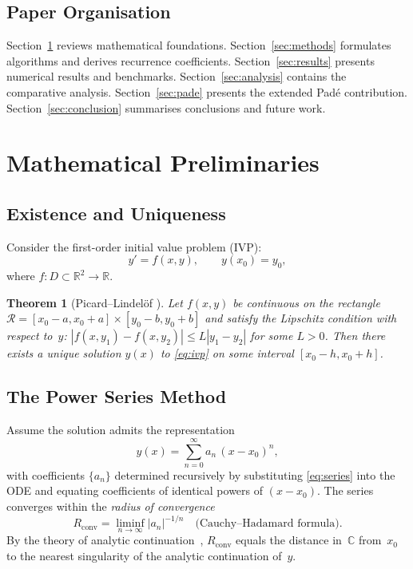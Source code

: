 \documentclass[12pt,a4paper]{article}
\newtheorem{theorem}{Theorem}[section]
\theoremstyle{definition}
\theoremstyle{remark}
\newcommand{\R}{\mathbb{R}}
\newcommand{\C}{\mathbb{C}}
\newcommand{\Rconv}{R_{\mathrm{conv}}}
\newcommand{\abs}[1]{\left\lvert #1 \right\rvert}
\begin{document}
\subsection{Paper Organisation}

Section~\ref{sec:prelim} reviews mathematical foundations.
Section~\ref{sec:methods} formulates algorithms and derives
recurrence coefficients.
Section~\ref{sec:results} presents numerical results and benchmarks.
Section~\ref{sec:analysis} contains the comparative analysis.
Section~\ref{sec:pade} presents the extended Padé contribution.
Section~\ref{sec:conclusion} summarises conclusions and future work.

\section{Mathematical Preliminaries}
\label{sec:prelim}

\subsection{Existence and Uniqueness}

Consider the first-order initial value problem (IVP):
\begin{equation}
  y' = f(x, y), \qquad y(x_0) = y_0,
  \label{eq:ivp}
\end{equation}
where $f: D \subset \R^2 \to \R$.

\begin{theorem}[Picard--Lindelöf {\cite{picard1890,lindelof1894}}]
  \label{thm:pl}
  Let $f(x,y)$ be continuous on the rectangle
  $\mathcal{R} = [x_0{-}a, x_0{+}a] \times [y_0{-}b, y_0{+}b]$
  and satisfy the Lipschitz condition with respect to~$y$:
  $\abs{f(x,y_1) - f(x,y_2)} \leq L\abs{y_1 - y_2}$ for some
  $L > 0$.  Then there exists a unique solution $y(x)$ to
  \eqref{eq:ivp} on some interval $[x_0{-}h, x_0{+}h]$.
\end{theorem}

\subsection{The Power Series Method}

Assume the solution admits the representation
\begin{equation}
  y(x) = \sum_{n=0}^{\infty} a_n\,(x - x_0)^n,
  \label{eq:series}
\end{equation}
with coefficients $\{a_n\}$ determined recursively by substituting
\eqref{eq:series} into the ODE and equating coefficients of identical
powers of $(x - x_0)$.  The series converges within the
\emph{radius of convergence}
\begin{equation}
  \Rconv = \liminf_{n\to\infty} \abs{a_n}^{-1/n}
  \quad \text{(Cauchy--Hadamard formula).}
  \label{eq:CH}
\end{equation}
By the theory of analytic continuation~\cite{coddington1955},
$\Rconv$ equals the distance in~$\C$ from~$x_0$ to the nearest
singularity of the analytic continuation of~$y$.
\end{document}
